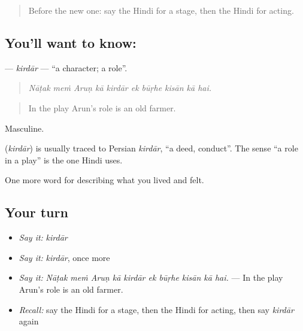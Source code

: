 \label{lesson:HI-C529-kirdar}



\begin{quote}
Before the new one: say the Hindi for a stage, then the Hindi for acting.
\end{quote}

\subsection*{You'll want to know: }
\textbf{} — \emph{kirdār} — \textquotedblleft{}a character; a role\textquotedblright{}.

\begin{quote}
         
\end{quote}

\begin{quote}
\emph{Nāṭak meṁ Aruṇ kā kirdār ek būṛhe kisān kā hai.}
\end{quote}

\begin{quote}
In the play Arun's role is an old farmer.
\end{quote}

Masculine.

\begin{cousinweb}
\textbf{} (\emph{kirdār}) is usually traced to Persian \emph{kirdār}, \textquotedblleft{}a deed, conduct\textquotedblright{}. The sense \textquotedblleft{}a role in a play\textquotedblright{} is the one Hindi uses.
\end{cousinweb}

\begin{grammarlens}[title={What you've built}]
One more word for describing what you lived and felt.
\end{grammarlens}

\subsection*{Your turn}
\begin{itemize}
\raggedright
  \item \emph{Say it:} \emph{kirdār}
  \item \emph{Say it:} \emph{kirdār}, once more
  \item \emph{Say it:} \emph{Nāṭak meṁ Aruṇ kā kirdār ek būṛhe kisān kā hai.} — In the play Arun's role is an old farmer.
  \item \emph{Recall:} say the Hindi for a stage, then the Hindi for acting, then say \emph{kirdār} again
\end{itemize}

